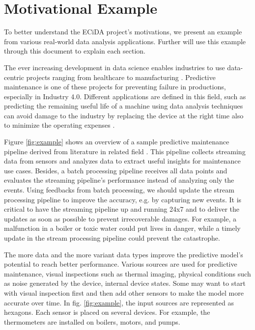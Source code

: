 \section{Motivational Example}
\label{sec:motiv}
To better understand the ECiDA project's motivations, we present an example from various real-world data analysis applications. Further will use this example through this document to explain each section. 

The ever increasing development in data science enables industries to use data-centric projects ranging from healthcare \cite{qadri2020future} to manufacturing \cite{ismail2019manufacturing}. Predictive maintenance is one of these projects for preventing failure in productions, especially in Industry 4.0. Different applications are defined in this field, such as predicting the remaining useful life of a machine using data analysis techniques can avoid damage to the industry by replacing the device at the right time also to minimize the operating expenses \cite{mobley2002introduction}. 

Figure \ref{fig:example} shows an overview of a sample predictive maintenance pipeline derived from literature in related field \cite{sahal2020big,yamato2016proposal,short2019industrial}. This pipeline collects streaming data from sensors and analyzes data to extract useful insights for maintenance use cases. Besides, a batch processing pipeline receives all data points and evaluates the streaming pipeline's performance instead of analyzing only the events. Using feedbacks from batch processing, we should update the stream processing pipeline to improve the accuracy, e.g. by capturing new events. It is critical to have the streaming pipeline up and running 24x7 and to deliver the updates as soon as possible to prevent irrecoverable damages. For example, a malfunction in a boiler or toxic water could put lives in danger, while a timely update in the stream processing pipeline could prevent the catastrophe. 

The more data and the more variant data types improve the predictive model's potential to reach better performance. Various sources are used for predictive maintenance, visual inspections such as thermal imaging, physical conditions such as noise generated by the device, internal device states. Some may want to start with visual inspection first and then add other sensors to make the model more accurate over time. In fig. \ref{fig:example}, the input sources are represented as hexagons. Each sensor is placed on several devices. For example, the thermometers are installed on boilers, motors, and pumps. 

